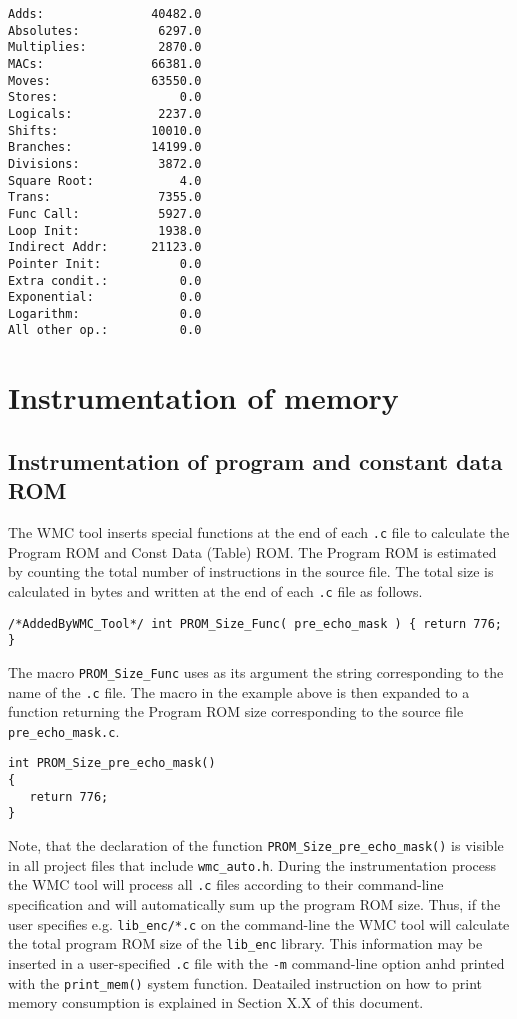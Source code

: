 \begin{Verbatim}[fontsize=\small]
Adds:               40482.0
Absolutes:           6297.0
Multiplies:          2870.0
MACs:               66381.0
Moves:              63550.0
Stores:                 0.0
Logicals:            2237.0
Shifts:             10010.0
Branches:           14199.0
Divisions:           3872.0
Square Root:            4.0
Trans:               7355.0
Func Call:           5927.0
Loop Init:           1938.0
Indirect Addr:      21123.0
Pointer Init:           0.0
Extra condit.:          0.0
Exponential:            0.0
Logarithm:              0.0
All other op.:          0.0
\end{Verbatim}

\section{Instrumentation of memory}
\label{ch:instrumentation_of_memory}

\subsection{Instrumentation of program and constant data ROM}

The WMC tool inserts special functions at the end of each \verb|.c| file to calculate the Program ROM and Const Data (Table) ROM. The Program ROM is estimated by counting the total number of instructions in the source file. The total size is calculated in bytes and written at the end of each \verb|.c| file as follows.

\begin{Verbatim}[fontsize=\small]
/*AddedByWMC_Tool*/ int PROM_Size_Func( pre_echo_mask ) { return 776; }
\end{Verbatim}

The macro \verb|PROM_Size_Func| uses as its argument the string corresponding to the name of the \verb|.c| file. The macro in the example above is then expanded to a function returning the Program ROM size corresponding to the source file \verb|pre_echo_mask.c|.

\begin{Verbatim}[fontsize=\small]
int PROM_Size_pre_echo_mask()
{
   return 776; 
}
\end{Verbatim}

Note, that the declaration of the function \verb|PROM_Size_pre_echo_mask()| is visible in all project files that include \verb|wmc_auto.h|. During the instrumentation process the WMC tool will process all \verb|.c| files according to their command-line specification and will automatically sum up the program ROM size. Thus, if the user specifies e.g. \verb|lib_enc/*.c| on the command-line the WMC tool will calculate the total program ROM size of the \verb|lib_enc| library. This information may be inserted in a user-specified \verb|.c| file with the \verb|-m| command-line option anhd printed with the \verb|print_mem()| system function. Deatailed instruction on how to print memory consumption is explained in Section X.X of this document.

